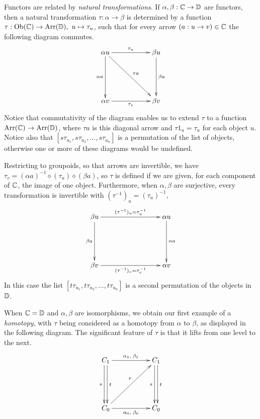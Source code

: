 Functors are related by \emph{natural transformations}. 
  
If $\alpha,\beta : \mathbb{C} \to \mathbb{D}$ are functors, 
then a natural transformation  $\tau : \alpha \to \beta$ 
is determined by a function 
$\tau : \mathrm{Ob}(\mathbb{C}) \to \mathrm{Arr}(\mathbb{D}),~ u \mapsto \tau_u$, 
such that for every arrow $(a : u \to v) \in \mathbb{C}$ 
the following diagram commutes.
$$
\xymatrix{ 
  \alpha u  \ar[rr]^{\tau_u} \ar[dd]_{\alpha a} \ar[ddrr]^{\tau a}
    &&  \beta u \ar[dd]^{\beta a} \\
    &&  \\
  \alpha v  \ar[rr]_{\tau_v} 
    &&  \beta v  \\
}
$$
Notice that commutativity of the diagram enables us to extend $\tau$ 
to a function $\mathrm{Arr}(\mathbb{C}) \to \mathrm{Arr}(\mathbb{D})$, 
where $\tau a$ is this diagonal arrow and 
$\tau 1_u=\tau_u$ for each object $u$. 
Notice also that $[s\tau_{u_1},s\tau_{u_2},\ldots,s\tau_{u_n}]$ 
is a permutation of the list of objects, 
otherwise one or more of these diagrams would be undefined.

\medskip
Restricting to groupoids, so that arrows are invertible, 
we have $\tau_v = (\alpha a)^{-1}\diamond(\tau_u)\diamond(\beta a)$, 
so $\tau$ is defined if we are given, for each component of $\mathbb{C}$, 
the image of one object. 
Furthermore, when $\alpha,\beta$ are surjective, 
every transformation is invertible with $(\tau^{-1})_u = (\tau_u)^{-1}$,  
$$
\xymatrix{ 
  \beta u  \ar[rrr]^{(\tau^{-1})_u = \tau_u^{-1}} \ar[dd]_{\beta a} 
    &&&  \alpha u \ar[dd]^{\alpha a} \\
    &&&  \\
  \beta v  \ar[rrr]_{(\tau^{-1})_v = \tau_v^{-1}}  
    &&&  \alpha v  \\
}
$$
In this case the list $[t\tau_{u_1},t\tau_{u_2},\ldots,t\tau_{u_n}]$ 
is a second permutation of the objects in $\mathbb{D}$. 

When $\mathbb{C}=\mathbb{D}$ and $\alpha,\beta$ are isomorphisms, 
we obtain our first example of a \emph{homotopy}, 
with $\tau$ being considered as a homotopy from $\alpha$ to $\beta$, 
as displayed in the following diagram. 
The significant feature of $\tau$ is that it lifts from one level to the next. 
$$
\xymatrix{ 
  C_1  \ar[rr]^{\alpha_1,\;\beta_1} \ar[dd]<-0.5ex>_s \ar[dd]<0.5ex>^t 
    &&  C_1   \ar[dd]<-0.5ex>_s \ar[dd]<0.5ex>^t \\
    &&  \\
  C_0  \ar[rr]_{\alpha_0,\;\beta_0} \ar[uurr]^(0.55){\tau}
    &&  C_0  \\
}
$$

